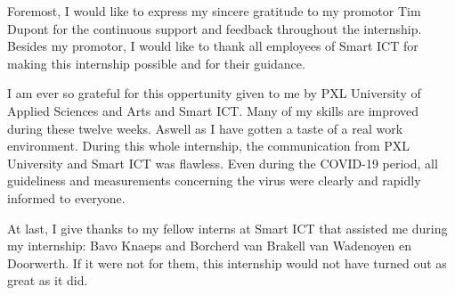 Foremost, I would like to express my sincere gratitude to my promotor Tim Dupont for the continuous support and feedback throughout the internship. Besides my promotor, I would like to thank all employees of Smart ICT for making this internship possible and for their guidance.

I am ever so grateful for this oppertunity given to me by PXL University of Applied Sciences and Arts and Smart ICT. Many of my skills are improved during these twelve weeks. Aswell as I have gotten a taste of a real work environment. During this whole internship, the communication from PXL University and Smart ICT was flawless. Even during the COVID\hyp{}19 period, all guideliness and measurements concerning the virus were clearly and rapidly informed to everyone.

At last, I give thanks to my fellow interns at Smart ICT that assisted me during my internship: Bavo Knaeps and Borcherd van Brakell van Wadenoyen en Doorwerth. If it were not for them, this internship would not have turned out as great as it did.